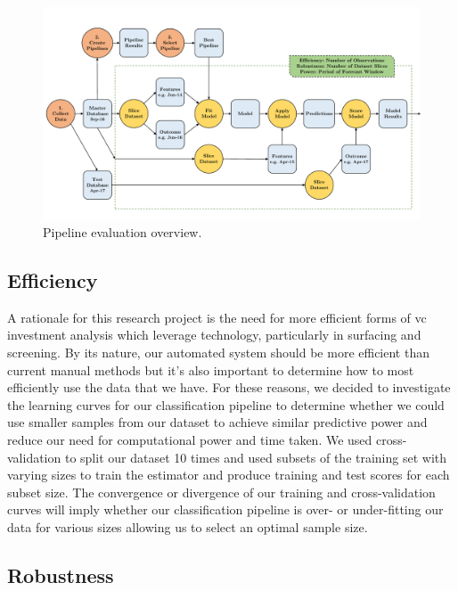 \documentclass[../thesis/thesis.tex]{subfiles}
\begin{document}
\begin{figure}[!htb]
    \centering
    \includegraphics[width=\textwidth]{../figures/design/pipeline_evaluation}
    \caption{Pipeline evaluation overview.}
    \label{fig:design:pipeline_evaluation}
\end{figure}

\subsection{Efficiency}

A rationale for this research project is the need for more efficient forms of \gls{vc} investment analysis which leverage technology, particularly in surfacing and screening. By its nature, our automated system should be more efficient than current manual methods but it's also important to determine how to most efficiently use the data that we have. For these reasons, we decided to investigate the learning curves for our classification pipeline to determine whether we could use smaller samples from our dataset to achieve similar predictive power and reduce our need for computational power and time taken. We used cross-validation to split our dataset 10 times and used subsets of the training set with varying sizes to train the estimator and produce training and test scores for each subset size. The convergence or divergence of our training and cross-validation curves will imply whether our classification pipeline is over- or under-fitting our data for various sizes allowing us to select an optimal sample size.

\subsection{Robustness}
\end{document}
